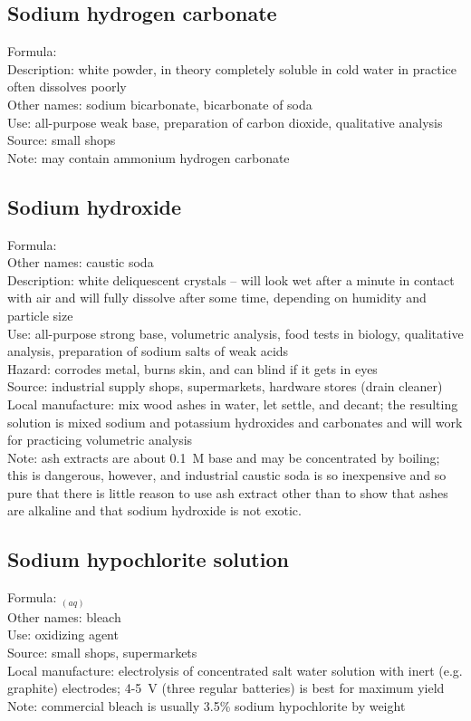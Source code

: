 \subsection*{Sodium hydrogen carbonate}
Formula: \\
Description: white powder, 
in theory completely soluble in cold water 
in practice often dissolves poorly\\
Other names: sodium bicarbonate, 
bicarbonate of soda\\
Use: all-purpose weak base, 
preparation of carbon dioxide, 
qualitative analysis\\
Source: small shops \\
Note: may contain ammonium hydrogen carbonate
\subsection*{Sodium hydroxide}
Formula: \\
Other names: caustic soda\\
Description: white deliquescent crystals -- 
will look wet after a minute in contact with air 
and will fully dissolve after some time, 
depending on humidity and particle size\\ 
Use: all-purpose strong base, 
volumetric analysis, 
food tests in biology, 
qualitative analysis, 
preparation of sodium salts of weak acids\\
Hazard: corrodes metal, 
burns skin, 
and can blind if it gets in eyes\\
Source: industrial supply shops, 
supermarkets, 
hardware stores (drain cleaner)\\
Local manufacture: mix wood ashes in water, 
let settle, 
and decant; 
the resulting solution is mixed sodium and potassium hydroxides 
and carbonates and will work for practicing volumetric analysis\\
Note: ash extracts are about 0.1~M base and may be concentrated by boiling; 
this is dangerous, 
however, 
and industrial caustic soda is so inexpensive 
and so pure that there is little reason to use ash extract 
other than to show that ashes are alkaline 
and that sodium hydroxide is not exotic.
\subsection*{Sodium hypochlorite solution}
Formula: $_{(aq)}$\\
Other names: bleach\\
Use: oxidizing agent\\
Source: small shops, 
supermarkets\\
Local manufacture: electrolysis of concentrated salt water solution 
with inert (e.g. 
graphite) electrodes; 
4-5~V (three regular batteries) is best for maximum yield\\
Note: commercial bleach is usually 3.5\% sodium hypochlorite by weight
